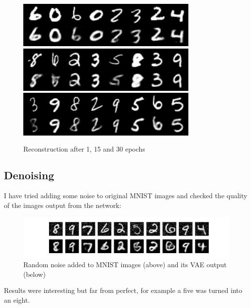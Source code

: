 \documentclass{article}
\begin{document}
\begin{figure}[H]%
    \centering
    \includegraphics[width=9cm]{imgs/reconstruction_1.png}
    \includegraphics[width=9cm]{imgs/reconstruction_15.png}
    \includegraphics[width=9cm]{imgs/reconstruction_30.png}
    \caption{Reconstruction after 1, 15 and 30 epochs}%
    \label{recontruction}%
\end{figure}

\subsection{Denoising}
I have tried adding some noise to original MNIST images and checked the quality of the images output from the network:
\begin{figure}[H]
  \begin{center}
    \includegraphics[width=\linewidth]{imgs/denoise.png}
    \caption{Random noise added to MNIST images (above) and its VAE output (below)}\label{denoise}
  \end{center}
\end{figure}
Results were interesting but far from perfect, for example a five was turned into an eight.
\end{document}
